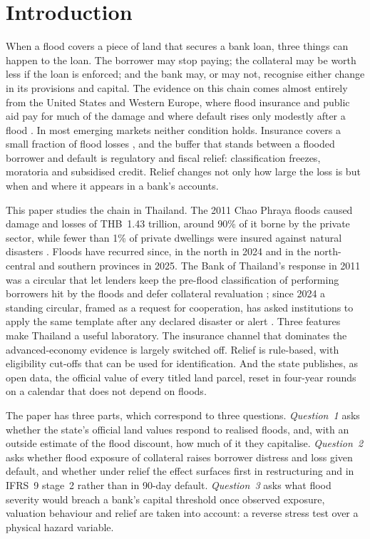\section{Introduction}\label{sec:intro}

When a flood covers a piece of land that secures a bank loan, three things can happen to the loan. The borrower may stop paying; the collateral may be worth less if the loan is enforced; and the bank may, or may not, recognise either change in its provisions and capital. The evidence on this chain comes almost entirely from the United States and Western Europe, where flood insurance and public aid pay for much of the damage and where default rises only modestly after a flood \citep{gallagher2017household,albertazzi2026physical}. In most emerging markets neither condition holds. Insurance covers a small fraction of flood losses \citep{swissre2022extreme}, and the buffer that stands between a flooded borrower and default is regulatory and fiscal relief: classification freezes, moratoria and subsidised credit. Relief changes not only how large the loss is but when and where it appears in a bank's accounts.

This paper studies the chain in Thailand. The 2011 Chao Phraya floods caused damage and losses of THB~1.43 trillion, around 90\% of it borne by the private sector, while fewer than 1\% of private dwellings were insured against natural disasters \citep{worldbank2012thai}. Floods have recurred since, in the north in 2024 and in the north-central and southern provinces in 2025. The Bank of Thailand's response in 2011 was a circular that let lenders keep the pre-flood classification of performing borrowers hit by the floods and defer collateral revaluation \citep{bot2011circular1564}; since 2024 a standing circular, framed as a request for cooperation, has asked institutions to apply the same template after any declared disaster or alert \citep{bot2024circular601}. Three features make Thailand a useful laboratory. The insurance channel that dominates the advanced-economy evidence is largely switched off. Relief is rule-based, with eligibility cut-offs that can be used for identification. And the state publishes, as open data, the official value of every titled land parcel, reset in four-year rounds on a calendar that does not depend on floods.

The paper has three parts, which correspond to three questions. \emph{Question~1} asks whether the state's official land values respond to realised floods, and, with an outside estimate of the flood discount, how much of it they capitalise. \emph{Question~2} asks whether flood exposure of collateral raises borrower distress and loss given default, and whether under relief the effect surfaces first in restructuring and in IFRS~9 stage~2 rather than in 90-day default. \emph{Question~3} asks what flood severity would breach a bank's capital threshold once observed exposure, valuation behaviour and relief are taken into account: a reverse stress test over a physical hazard variable.

